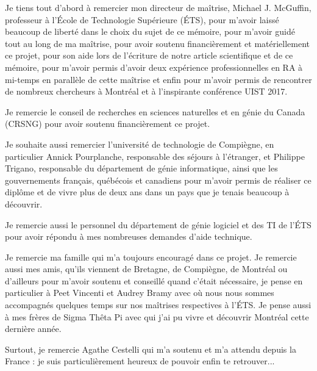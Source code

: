 Je tiens tout d'abord à remercier mon directeur de maîtrise, Michael J. McGuffin, professeur à l'École de Technologie Supérieure (ÉTS), pour m'avoir laissé beaucoup de liberté dans le choix du sujet de ce mémoire, pour m'avoir guidé tout au long de ma maîtrise, pour avoir soutenu financièrement et matériellement ce projet, pour son aide lors de l'écriture de notre article scientifique et de ce mémoire, pour m'avoir permis d'avoir deux expérience professionnelles en RA à mi-temps en parallèle de cette maîtrise et enfin pour m'avoir permis de rencontrer de nombreux chercheurs à Montréal et à l'inspirante conférence UIST 2017.

Je remercie le conseil de recherches en sciences naturelles et en génie du Canada (CRSNG) pour avoir soutenu financièrement ce projet.

Je souhaite aussi remercier l'université de technologie de Compiègne, en particulier Annick Pourplanche, responsable des séjours à l'étranger, et Philippe Trigano, responsable du département de génie informatique, ainsi que les gouvernements français, québécois et canadiens pour m'avoir permis de réaliser ce diplôme et de vivre plus de deux ans dans un pays que je tenais beaucoup à découvrir.

Je remercie aussi le personnel du département de génie logiciel et des TI de l'ÉTS pour avoir répondu à mes nombreuses demandes d'aide technique.

Je remercie ma famille qui m'a toujours encouragé dans ce projet. Je remercie aussi mes amis, qu'ils viennent de Bretagne, de Compiègne, de Montréal ou d'ailleurs pour m'avoir soutenu et conseillé quand c'était nécessaire, je pense en particulier à Peet Vincenti et Audrey Bramy avec où nous nous sommes accompagnés quelques temps sur nos maîtrises respectives à l'ÉTS. Je pense aussi à mes frères de Sigma Thêta Pi avec qui j'ai pu vivre et découvrir Montréal cette dernière année. 

Surtout, je remercie Agathe Cestelli qui m'a soutenu et m'a attendu depuis la France : je suis particulièrement heureux de pouvoir enfin te retrouver...